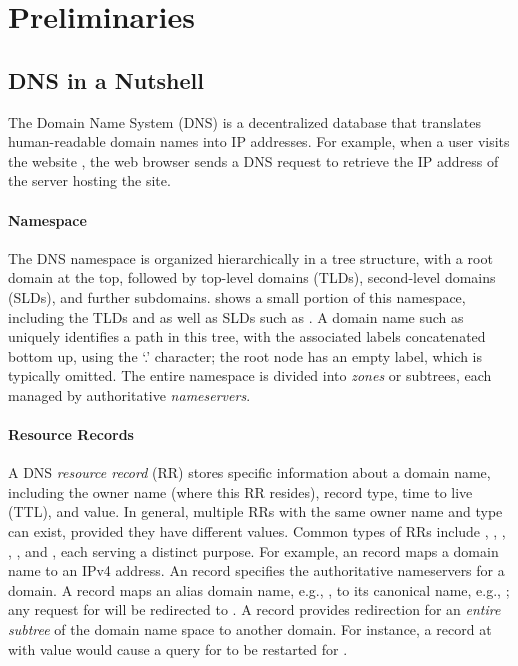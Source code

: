 \section{Preliminaries}


\subsection{DNS in a Nutshell} \label{subsec:dns}
The Domain Name System (DNS) is a decentralized database that translates human-readable domain names into  IP addresses. For example, when a user visits the website , the web browser  sends a DNS request to retrieve the IP address of the server hosting the site.

\paragraph{Namespace} 
The DNS namespace is organized hierarchically in a tree structure, 
with a root domain at the top, followed by top-level domains (TLDs), second-level domains (SLDs), and further subdomains. 
 shows a small portion of this namespace, including the 
TLDs  and  as well as  SLDs such as 
. 
A domain name such as  uniquely identifies a path in this tree, with the associated labels concatenated  bottom up, using the `.' character; the root node has an empty label, which is typically omitted. 
The entire namespace is divided into \emph{zones} or subtrees,
each managed by authoritative \emph{nameservers}.

\paragraph{Resource Records}
A DNS \emph{resource record} (RR) stores 
specific information about a domain name,
including the owner name (where this RR resides), record type, time to live (TTL), and 
value. In general, multiple
RRs with the same owner name and type can exist, provided they have
different values. 
Common types of RRs include 
, , , ,  , and , 
each serving a distinct purpose. 
For example, an  record 
maps a domain name to an IPv4 address.
An  record
specifies the authoritative nameservers for a domain.
A  record
maps an alias domain name, e.g., , 
to its canonical name, e.g., ; any request for  will be redirected to .
A  record
provides redirection for an \emph{entire subtree} of the domain name space to another domain.
For instance, 
a  record at  with value 
would cause a query for  
to be restarted for .



